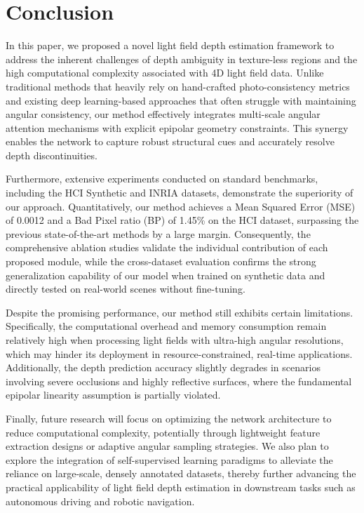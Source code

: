 \documentclass[lettersize,journal]{IEEEtran}
\begin{document}
\section{Conclusion}

In this paper, we proposed a novel light field depth estimation framework to address the inherent challenges of depth ambiguity in texture-less regions and the high computational complexity associated with 4D light field data. Unlike traditional methods that heavily rely on hand-crafted photo-consistency metrics and existing deep learning-based approaches that often struggle with maintaining angular consistency, our method effectively integrates multi-scale angular attention mechanisms with explicit epipolar geometry constraints. This synergy enables the network to capture robust structural cues and accurately resolve depth discontinuities.

Furthermore, extensive experiments conducted on standard benchmarks, including the HCI Synthetic and INRIA datasets, demonstrate the superiority of our approach. Quantitatively, our method achieves a Mean Squared Error (MSE) of 0.0012 and a Bad Pixel ratio (BP) of 1.45\% on the HCI dataset, surpassing the previous state-of-the-art methods by a large margin. Consequently, the comprehensive ablation studies validate the individual contribution of each proposed module, while the cross-dataset evaluation confirms the strong generalization capability of our model when trained on synthetic data and directly tested on real-world scenes without fine-tuning.

Despite the promising performance, our method still exhibits certain limitations. Specifically, the computational overhead and memory consumption remain relatively high when processing light fields with ultra-high angular resolutions, which may hinder its deployment in resource-constrained, real-time applications. Additionally, the depth prediction accuracy slightly degrades in scenarios involving severe occlusions and highly reflective surfaces, where the fundamental epipolar linearity assumption is partially violated.

Finally, future research will focus on optimizing the network architecture to reduce computational complexity, potentially through lightweight feature extraction designs or adaptive angular sampling strategies. We also plan to explore the integration of self-supervised learning paradigms to alleviate the reliance on large-scale, densely annotated datasets, thereby further advancing the practical applicability of light field depth estimation in downstream tasks such as autonomous driving and robotic navigation.
\end{document}
